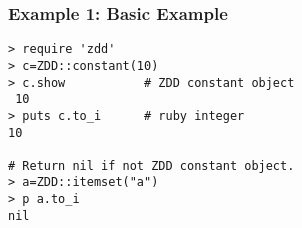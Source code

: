 \subsubsection*{Example 1: Basic Example}



\begin{Verbatim}[baselinestretch=0.7,frame=single]
> require 'zdd'
> c=ZDD::constant(10)
> c.show           # ZDD constant object
 10
> puts c.to_i      # ruby integer
10

# Return nil if not ZDD constant object. 
> a=ZDD::itemset("a")
> p a.to_i
nil
\end{Verbatim}
